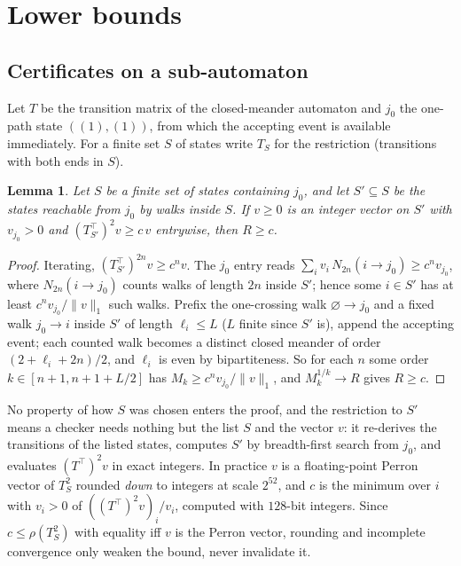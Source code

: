 \documentclass[11pt]{amsart}
\newtheorem{lemma}[theorem]{Lemma}
\theoremstyle{definition}
\newcommand{\ttop}{^{\!\top}}
\begin{document}
\section{Lower bounds}\label{sec:lower}

\subsection{Certificates on a sub-automaton}
Let $T$ be the transition matrix of the closed-meander automaton and $j_0$ the one-path state $((1),(1))$, from which the accepting event is available immediately. For a finite set $S$ of states write $T_S$ for the restriction (transitions with both ends in $S$).

\begin{lemma}\label{lem:cert}
Let $S$ be a finite set of states containing $j_0$, and let $S'\subseteq S$ be the states reachable from $j_0$ by walks inside $S$. If $v\ge0$ is an integer vector on $S'$ with $v_{j_0}>0$ and $(T_{S'}\ttop)^2v\ge c\,v$ entrywise, then $R\ge c$.
\end{lemma}

\begin{proof}
Iterating, $(T_{S'}\ttop)^{2n}v\ge c^nv$. The $j_0$ entry reads $\sum_iv_i\,N_{2n}(i\to j_0)\ge c^nv_{j_0}$, where $N_{2n}(i\to j_0)$ counts walks of length $2n$ inside $S'$; hence some $i\in S'$ has at least $c^nv_{j_0}/\|v\|_1$ such walks. Prefix the one-crossing walk $\varnothing\to j_0$ and a fixed walk $j_0\to i$ inside $S'$ of length $\ell_i\le L$ ($L$ finite since $S'$ is), append the accepting event; each counted walk becomes a distinct closed meander of order $(2+\ell_i+2n)/2$, and $\ell_i$ is even by bipartiteness. So for each $n$ some order $k\in[n+1,n+1+L/2]$ has $M_k\ge c^nv_{j_0}/\|v\|_1$, and $M_k^{1/k}\to R$ gives $R\ge c$.
\end{proof}

No property of how $S$ was chosen enters the proof, and the restriction to $S'$ means a checker needs nothing but the list $S$ and the vector $v$: it re-derives the transitions of the listed states, computes $S'$ by breadth-first search from $j_0$, and evaluates $(T\ttop)^2v$ in exact integers. In practice $v$ is a floating-point Perron vector of $T_S^2$ rounded \emph{down} to integers at scale $2^{52}$, and $c$ is the minimum over $i$ with $v_i>0$ of $((T\ttop)^2v)_i/v_i$, computed with $128$-bit integers. Since $c\le\rho(T_S^2)$ with equality iff $v$ is the Perron vector, rounding and incomplete convergence only weaken the bound, never invalidate it.
\end{document}
